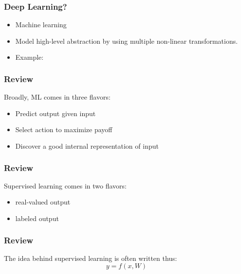 \begin{frame}
  \frametitle{Deep Learning?}
  \begin{itemize}
  \item<1-> Machine learning
  \item<1-> Model high-level abstraction by using multiple non-linear
    transformations.
  \item<2-> Example: 
  \end{itemize}
\end{frame}

\begin{frame}
  \frametitle{Review}
  Broadly, ML comes in three flavors:
  \begin{itemize}
  \item {} Predict output given input
  \item {} Select action to maximize payoff
  \item {} Discover a good internal
    representation of input
  \end{itemize}
\end{frame}

\begin{frame}
  \frametitle{Review}
  Supervised learning comes in two flavors:
  \begin{itemize}
  \item {} real-valued output
  \item {} labeled output
  \end{itemize}
\end{frame}

\begin{frame}
  \frametitle{Review}
  The idea behind supervised learning is often written thus:
  \begin{displaymath}
    y = f(x,W)
  \end{displaymath}
\end{frame}

